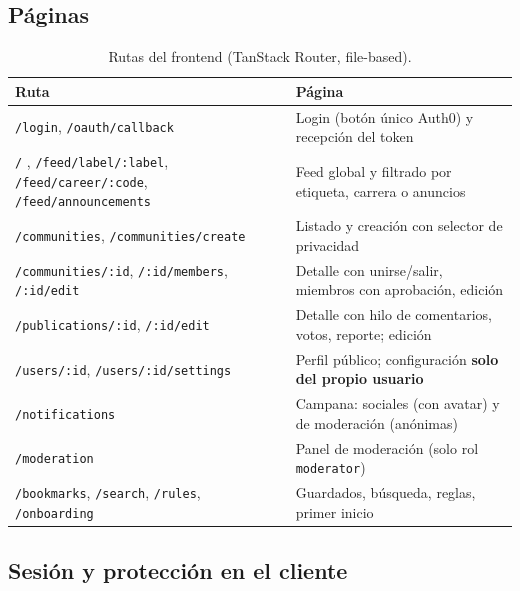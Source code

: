\documentclass{article}
\begin{document}
\subsection{Páginas}

\begin{table}[H]
\setlength{\tabcolsep}{0.4em}
{\renewcommand{\arraystretch}{1.22}
\footnotesize
\begin{tabular}{|p{5.2cm}|p{9.2cm}|}
    \hline
    \rowcolor{tablebackground}
    \color{white}\textbf{Ruta} & \color{white}\textbf{Página} \\
    \hline
    \texttt{/login}, \texttt{/oauth/callback} & Login (botón único Auth0) y recepción del token \\
    \hline
    \texttt{/} , \texttt{/feed/label/:label}, \texttt{/feed/career/:code}, \texttt{/feed/announcements} & Feed global y filtrado por etiqueta, carrera o anuncios \\
    \hline
    \texttt{/communities}, \texttt{/communities/create} & Listado y creación con selector de privacidad \\
    \hline
    \texttt{/communities/:id}, \texttt{/:id/members}, \texttt{/:id/edit} & Detalle con unirse/salir, miembros con aprobación, edición \\
    \hline
    \texttt{/publications/:id}, \texttt{/:id/edit} & Detalle con hilo de comentarios, votos, reporte; edición \\
    \hline
    \texttt{/users/:id}, \texttt{/users/:id/settings} & Perfil público; configuración \textbf{solo del propio usuario} \\
    \hline
    \texttt{/notifications} & Campana: sociales (con avatar) y de moderación (anónimas) \\
    \hline
    \texttt{/moderation} & Panel de moderación (solo rol \texttt{moderator}) \\
    \hline
    \texttt{/bookmarks}, \texttt{/search}, \texttt{/rules}, \texttt{/onboarding} & Guardados, búsqueda, reglas, primer inicio \\
    \hline
\end{tabular}}
\caption{Rutas del frontend (TanStack Router, file-based).}
\end{table}

\subsection{Sesión y protección en el cliente}
\end{document}
